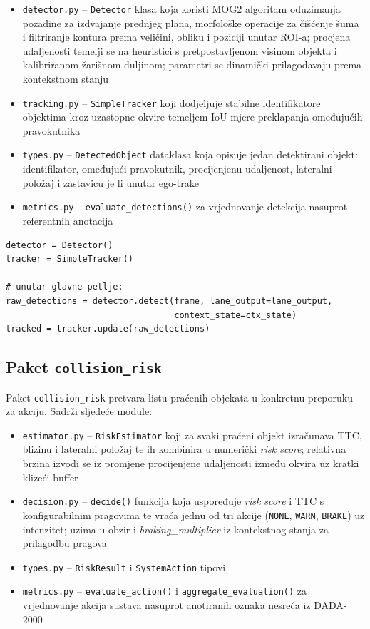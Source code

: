 \begin{itemize}
    \item \texttt{detector.py} -- \texttt{Detector} klasa koja koristi MOG2 algoritam oduzimanja pozadine za izdvajanje prednjeg plana, morfološke operacije za čišćenje šuma i filtriranje kontura prema veličini, obliku i poziciji unutar ROI-a; procjena udaljenosti temelji se na heuristici s pretpostavljenom visinom objekta i kalibriranom žarišnom duljinom; parametri se dinamički prilagođavaju prema kontekstnom stanju
    \item \texttt{tracking.py} -- \texttt{SimpleTracker} koji dodjeljuje stabilne identifikatore objektima kroz uzastopne okvire temeljem IoU mjere preklapanja omeđujućih pravokutnika
    \item \texttt{types.py} -- \texttt{DetectedObject} dataklasa koja opisuje jedan detektirani objekt: identifikator, omeđujući pravokutnik, procijenjenu udaljenost, lateralni položaj i zastavicu je li unutar ego-trake
    \item \texttt{metrics.py} -- \texttt{evaluate\_detections()} za vrjednovanje detekcija nasuprot referentnih anotacija
\end{itemize}

\begin{lstlisting}[style=pycode, caption={Detekcija i praćenje prepreka}, label={lst:obstacle}]
detector = Detector()
tracker = SimpleTracker()

# unutar glavne petlje:
raw_detections = detector.detect(frame, lane_output=lane_output,
                                 context_state=ctx_state)
tracked = tracker.update(raw_detections)
\end{lstlisting}

\subsection{Paket \texttt{collision\_risk}}

Paket \texttt{collision\_risk} pretvara listu praćenih objekata u konkretnu preporuku za akciju. Sadrži sljedeće module:

\begin{itemize}
    \item \texttt{estimator.py} -- \texttt{RiskEstimator} koji za svaki praćeni objekt izračunava TTC, blizinu i lateralni položaj te ih kombinira u numerički \textit{risk score}; relativna brzina izvodi se iz promjene procijenjene udaljenosti između okvira uz kratki klizeći buffer
    \item \texttt{decision.py} -- \texttt{decide()} funkcija koja uspoređuje \textit{risk score} i TTC s konfigurabilnim pragovima te vraća jednu od tri akcije (\texttt{NONE}, \texttt{WARN}, \texttt{BRAKE}) uz intenzitet; uzima u obzir i \textit{braking\_multiplier} iz kontekstnog stanja za prilagodbu pragova
    \item \texttt{types.py} -- \texttt{RiskResult} i \texttt{SystemAction} tipovi
    \item \texttt{metrics.py} -- \texttt{evaluate\_action()} i \texttt{aggregate\_evaluation()} za vrjednovanje akcija sustava nasuprot anotiranih oznaka nesreća iz DADA-2000
\end{itemize}

